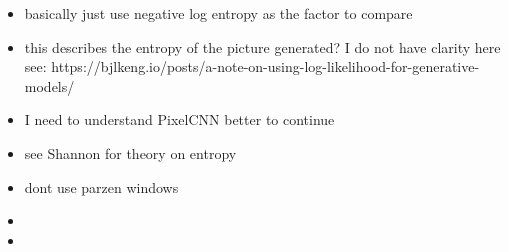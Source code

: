 \documentclass{article}
\begin{document}
\begin{itemize}
    \item basically just use negative log entropy as the factor to compare
    \item this describes the entropy of the picture generated? I do not have clarity here see: https://bjlkeng.io/posts/a-note-on-using-log-likelihood-for-generative-models/
    \item I need to understand PixelCNN better to continue
    \item see Shannon for theory on entropy \cite{shannon}
    \item dont use parzen windows \cite{note_on_eval}
    \item
    \item
\end{itemize}
    

\end{document}

